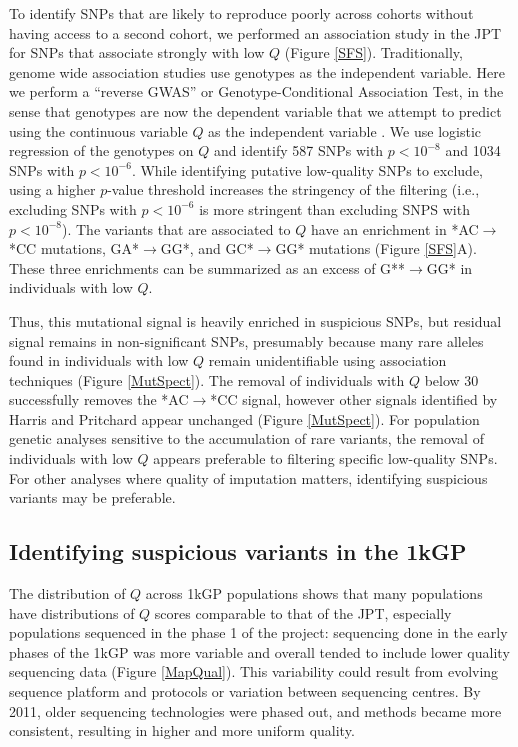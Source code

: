 \documentclass[custompaper]{MBE}%
\begin{document}
To identify SNPs that are likely to reproduce poorly across cohorts without having access to a second cohort, we performed an association study in the JPT for SNPs that associate strongly with low $Q$ (Figure \ref{SFS}).
Traditionally, genome wide association studies use genotypes as the independent variable. 
Here we perform a ``reverse GWAS'' or Genotype-Conditional Association Test, in the sense that genotypes are now the dependent variable that we attempt to predict using the continuous variable $Q$ as the independent variable \citep{song2015testing}.
We use logistic regression of the genotypes on $Q$ and identify 587 SNPs with $p < 10^{-8}$ and 1034 SNPs with $ p < 10^{-6}$. 
While identifying putative low-quality SNPs to exclude, using a higher $p$-value threshold increases the stringency of the filtering (i.e., excluding SNPs with $ p < 10^{-6}$ is more stringent than excluding SNPS with $p < 10^{-8}$). 
The variants that are associated to $Q$ have an enrichment in *AC${\rightarrow}$*CC mutations, GA*${\rightarrow}$GG*, and GC*${\rightarrow}$GG* mutations (Figure \ref{SFS}A).
These three enrichments can be summarized as an excess of G**${\rightarrow}$GG* in individuals with low $Q$.

Thus, this mutational signal is heavily enriched in suspicious SNPs, but residual signal remains in non-significant SNPs, presumably because many rare alleles found in individuals with low $Q$ remain unidentifiable using association techniques (Figure \ref{MutSpect}). The removal of individuals with $Q$ below 30 successfully removes the *AC${\rightarrow}$*CC signal, however other signals identified by Harris and Pritchard appear unchanged (Figure \ref{MutSpect}).
For population genetic analyses sensitive to the accumulation of rare variants, the removal of individuals with low $Q$ appears preferable to filtering specific low-quality SNPs. 
For other analyses where quality of imputation matters, identifying suspicious variants may be preferable. 


\subsection{Identifying suspicious variants in the 1kGP}
The distribution of $Q$ across 1kGP populations shows that many populations have distributions of $Q$ scores comparable to that of the JPT, especially populations sequenced in the phase 1 of the project: sequencing done in the early phases of the 1kGP was more variable and overall tended to include lower quality sequencing data (Figure \ref{MapQual}).
This variability could result from evolving sequence platform and protocols or variation between sequencing centres. 
By 2011, older sequencing technologies were phased out, and methods became more consistent, resulting in higher and more uniform quality.
\end{document}
